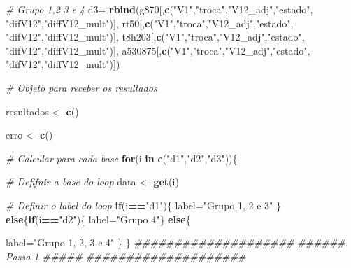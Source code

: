 \documentclass[12pt,a4paper]{article}
\newenvironment{Shaded}{\begin{snugshade}}{\end{snugshade}}
\newcommand{\CommentTok}[1]{\textcolor[rgb]{0.56,0.35,0.01}{\textit{#1}}}
\newcommand{\ControlFlowTok}[1]{\textcolor[rgb]{0.13,0.29,0.53}{\textbf{#1}}}
\newcommand{\KeywordTok}[1]{\textcolor[rgb]{0.13,0.29,0.53}{\textbf{#1}}}
\newcommand{\NormalTok}[1]{#1}
\newcommand{\OperatorTok}[1]{\textcolor[rgb]{0.81,0.36,0.00}{\textbf{#1}}}
\newcommand{\StringTok}[1]{\textcolor[rgb]{0.31,0.60,0.02}{#1}}
\begin{document}
\begin{Shaded}
\begin{Highlighting}[]
\CommentTok{# Grupo 1,2,3 e 4}
\NormalTok{d3=}\StringTok{ }\KeywordTok{rbind}\NormalTok{(g870[,}\KeywordTok{c}\NormalTok{(}\StringTok{"V1"}\NormalTok{,}\StringTok{"troca"}\NormalTok{,}\StringTok{"V12_adj"}\NormalTok{,}\StringTok{"estado"}\NormalTok{,}
                    \StringTok{"difV12"}\NormalTok{,}\StringTok{"diffV12_mult"}\NormalTok{)],}
\NormalTok{            rt50[,}\KeywordTok{c}\NormalTok{(}\StringTok{"V1"}\NormalTok{,}\StringTok{"troca"}\NormalTok{,}\StringTok{"V12_adj"}\NormalTok{,}\StringTok{"estado"}\NormalTok{,}
                    \StringTok{"difV12"}\NormalTok{,}\StringTok{"diffV12_mult"}\NormalTok{)],}
\NormalTok{            t8h203[,}\KeywordTok{c}\NormalTok{(}\StringTok{"V1"}\NormalTok{,}\StringTok{"troca"}\NormalTok{,}\StringTok{"V12_adj"}\NormalTok{,}\StringTok{"estado"}\NormalTok{,}
                      \StringTok{"difV12"}\NormalTok{,}\StringTok{"diffV12_mult"}\NormalTok{)],}
\NormalTok{            a530875[,}\KeywordTok{c}\NormalTok{(}\StringTok{"V1"}\NormalTok{,}\StringTok{"troca"}\NormalTok{,}\StringTok{"V12_adj"}\NormalTok{,}\StringTok{"estado"}\NormalTok{,}
                      \StringTok{"difV12"}\NormalTok{,}\StringTok{"diffV12_mult"}\NormalTok{)])}

\CommentTok{# Objeto para receber os resultados}

\NormalTok{resultados <-}\StringTok{ }\KeywordTok{c}\NormalTok{()}

\NormalTok{erro <-}\StringTok{ }\KeywordTok{c}\NormalTok{()}

\CommentTok{# Calcular para cada base}
\ControlFlowTok{for}\NormalTok{(i }\ControlFlowTok{in} \KeywordTok{c}\NormalTok{(}\StringTok{"d1"}\NormalTok{,}\StringTok{"d2"}\NormalTok{,}\StringTok{"d3"}\NormalTok{))\{}

  \CommentTok{# Defifnir a base do loop}
\NormalTok{  data <-}\StringTok{ }\KeywordTok{get}\NormalTok{(i)  }

  \CommentTok{# Definir o label do loop}
\ControlFlowTok{if}\NormalTok{(i}\OperatorTok{==}\StringTok{"d1"}\NormalTok{)\{}
\NormalTok{  label=}\StringTok{"Grupo 1, 2 e 3"}
\NormalTok{\} }\ControlFlowTok{else}\NormalTok{\{}\ControlFlowTok{if}\NormalTok{(i}\OperatorTok{==}\StringTok{"d2"}\NormalTok{)\{}
\NormalTok{  label=}\StringTok{"Grupo 4"}\NormalTok{\} }\ControlFlowTok{else}\NormalTok{\{}
    
\NormalTok{    label=}\StringTok{"Grupo 1, 2, 3 e 4"}
\NormalTok{  \}}
\NormalTok{\}}
  \CommentTok{####################}
  \CommentTok{###### Passo 1 #####}
  \CommentTok{####################}
  

\end{Highlighting}
\end{Shaded}
\end{document}
